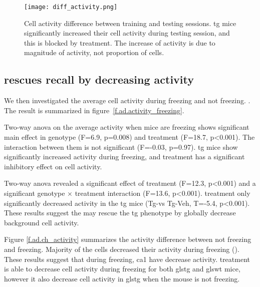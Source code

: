 \begin{figure}[h]
    \texttt{[image: diff\_activity.png]}
    \caption{Cell activity difference between training and testing sessions. \gls{tg} mice significantly increased their cell activity during testing session, and this is blocked by \tglu treatment. The increase of activity is due to magnitude of activity, not proportion of cells. \label{f.ad.actdiff}}
\end{figure}


\subsection{\tglu rescues recall by decreasing activity}

We then investigated the average cell activity during freezing and not freezing. . The result is summarized in figure~\ref{f.ad.activity_freezing}.  

Two-way \gls{anova} on the average activity when mice are freezing shows significant main effect in genotype (F=6.9, p=0.008) and treatment (F=18.7, p<0.001). The interaction between them is not significant (F=-0.03, p=0.97). \Gls{tg} mice show significantly increased activity during freezing, and \tglu treatment has a significant inhibitory effect on cell activity. 

Two-way \gls{anova} revealed a significant effect of treatment (F=12.3, p<0.001) and a significant genotype $\times$ treatment interaction (F=13.6, p<0.001). \tglu treatment only significantly decreased activity in the \gls{tg} mice (Tg-\glu vs Tg-Veh, T=-5.4, p<0.001). These results suggest the \tglu{} may rescue the \gls{tg} phenotype by globally decrease background cell activity.

Figure \ref{f.ad.ch_activity} summarizes the activity difference between not freezing and freezing. Majority of the cells decreased their activity during freezing (). These results suggest that during freezing, \gls{ca1} have decrease activity. \tglu treatment is able to decrease cell activity during freezing for both gls{tg} and gls{wt} mice, however it also decrease cell activity in gls{tg} when the mouse is not freezing.

